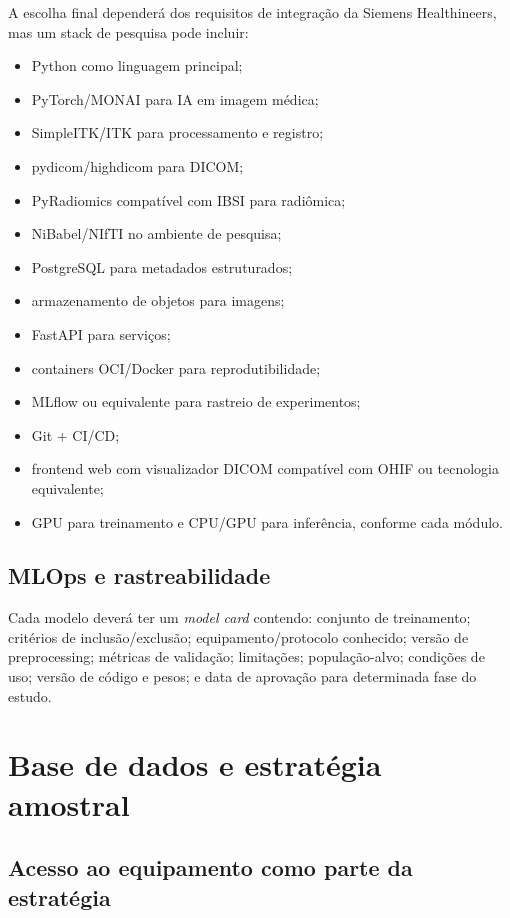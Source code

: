 \documentclass[11pt,a4paper]{article}
\begin{document}
A escolha final dependerá dos requisitos de integração da Siemens Healthineers, mas um stack de pesquisa pode incluir:

\begin{itemize}
\item Python como linguagem principal;
\item PyTorch/MONAI para IA em imagem médica;
\item SimpleITK/ITK para processamento e registro;
\item pydicom/highdicom para DICOM;
\item PyRadiomics compatível com IBSI para radiômica;
\item NiBabel/NIfTI no ambiente de pesquisa;
\item PostgreSQL para metadados estruturados;
\item armazenamento de objetos para imagens;
\item FastAPI para serviços;
\item containers OCI/Docker para reprodutibilidade;
\item MLflow ou equivalente para rastreio de experimentos;
\item Git + CI/CD;
\item frontend web com visualizador DICOM compatível com OHIF ou tecnologia equivalente;
\item GPU para treinamento e CPU/GPU para inferência, conforme cada módulo.
\end{itemize}

\subsection{MLOps e rastreabilidade}

Cada modelo deverá ter um \emph{model card} contendo: conjunto de treinamento; critérios de inclusão/exclusão; equipamento/protocolo conhecido; versão de preprocessing; métricas de validação; limitações; população-alvo; condições de uso; versão de código e pesos; e data de aprovação para determinada fase do estudo.

\section{Base de dados e estratégia amostral}

\subsection{Acesso ao equipamento como parte da estratégia}
\end{document}
